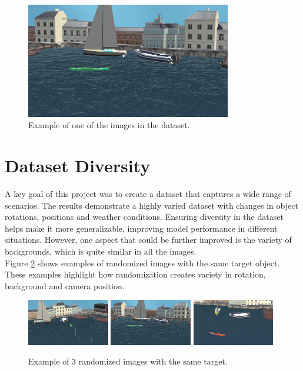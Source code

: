 \begin{figure}[H]
\centering
\includegraphics[width=0.8\textwidth]{Figures/results/rand2.png}
\caption{Example of one of the images in the dataset.}
\label{fig:original_image}
\end{figure}

\section{Dataset Diversity}
A key goal of this project was to create a dataset that captures a wide range of scenarios. The results demonstrate a highly varied dataset with changes in object rotations, positions and weather conditions. Ensuring diversity in the dataset helps make it more generalizable, improving model performance in different situations. However, one aspect that could be further improved is the variety of backgrounds, which is quite similar in all the images. \\

\noindent Figure \ref{fig:randomized_images} shows examples of randomized images with the same target object. These examples highlight how randomization creates variety in rotation, background and camera position.

\begin{figure}[H]
\centering
\includegraphics[width=0.32\textwidth]{Figures/results/rand1.png}
\includegraphics[width=0.32\textwidth]{Figures/results/rand2.png}
\includegraphics[width=0.32\textwidth]{Figures/results/rand3.png}
\caption{Example of 3 randomized images with the same target.}
\label{fig:randomized_images}
\end{figure}

